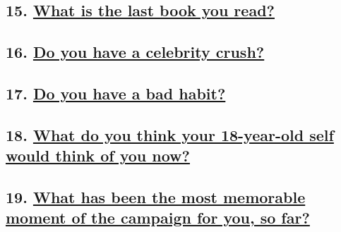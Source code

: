\hypertarget{15-what-is-the-last-book-you-read}{%
\subsection{\texorpdfstring{15.
\href{https://www.nytimes.com/interactive/2020/us/politics/books-20-questions.html}{What
is the last book you
read?}}{15. What is the last book you read?}}\label{15-what-is-the-last-book-you-read}}

\hypertarget{16-do-you-have-a-celebrity-crush}{%
\subsection{\texorpdfstring{16.
\href{https://www.nytimes.com/interactive/2020/us/politics/celebrity-crush-20-questions.html}{Do
you have a celebrity
crush?}}{16. Do you have a celebrity crush?}}\label{16-do-you-have-a-celebrity-crush}}

\hypertarget{17-do-you-have-a-bad-habit}{%
\subsection{\texorpdfstring{17.
\href{https://www.nytimes.com/interactive/2020/us/politics/bad-habits-20-questions.html}{Do
you have a bad
habit?}}{17. Do you have a bad habit?}}\label{17-do-you-have-a-bad-habit}}

\hypertarget{18-what-do-you-think-your-18-year-old-self-would-think-of-you-now}{%
\subsection{\texorpdfstring{18.
\href{https://www.nytimes.com/interactive/2020/us/politics/18-year-old-self-20-questions.html}{What
do you think your 18-year-old self would think of you
now?}}{18. What do you think your 18-year-old self would think of you now?}}\label{18-what-do-you-think-your-18-year-old-self-would-think-of-you-now}}

\hypertarget{19-what-has-been-the-most-memorable-moment-of-the-campaign-for-you-so-far}{%
\subsection{\texorpdfstring{19.
\href{https://www.nytimes.com/interactive/2020/us/politics/campaign-highlights-20-questions.html}{What
has been the most memorable moment of the campaign for you, so
far?}}{19. What has been the most memorable moment of the campaign for you, so far?}}\label{19-what-has-been-the-most-memorable-moment-of-the-campaign-for-you-so-far}}

